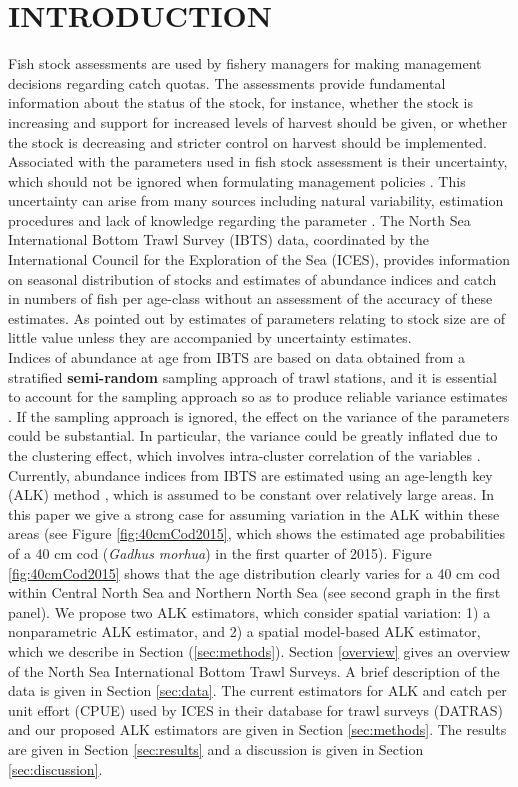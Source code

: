 \documentclass[a4paper 12pt]{article}
\numberwithin{equation}{section}
\begin{document}
\clearpage
\section{\large INTRODUCTION}
Fish stock assessments are used by fishery managers for making management decisions regarding catch quotas. The assessments provide fundamental information about the status of the stock, for instance, whether the stock is increasing and support for increased levels of harvest should be given, or whether the stock is decreasing and stricter control on harvest should be implemented. Associated with the parameters used in fish stock assessment is their uncertainty, which should not be ignored when formulating management policies \citep{walters1981effects, ludwig1981measurement}. This uncertainty can arise from many sources including natural variability, estimation procedures and lack of knowledge regarding the parameter \citep{ehrhardt1997role}. The North Sea International Bottom Trawl Survey (IBTS) data, coordinated by the International Council for the Exploration of the Sea (ICES), provides information on seasonal distribution of stocks and estimates of abundance indices and catch in numbers of fish per age-class without an assessment of the accuracy of these estimates.  As pointed out by  \citet{ludwig1981measurement} estimates of parameters relating to stock size are of little value unless they are accompanied by uncertainty estimates. \\
\indent Indices of abundance at age from IBTS  are based on data obtained from a stratified {\bf semi-random} sampling approach of trawl stations,  and  it is essential to account for the sampling approach so as to produce reliable variance estimates \citep{lehtonen2004practical}. If the sampling approach is ignored, the effect on the variance  of the parameters could be substantial.  In particular, the variance could be greatly inflated  due to the clustering effect, which involves intra-cluster correlation of the variables \citep{aanes2015efficient, lehtonen2004practical}. Currently, abundance indices from  IBTS are estimated using an age-length key (ALK) method \citep{fridriksson1934calculation}, which is assumed to be constant  over relatively large areas. In this paper we give a strong case for assuming variation in the ALK within these areas (see Figure \ref{fig:40cmCod2015}, which shows the estimated age probabilities of a 40 cm cod (\emph{Gadhus morhua}) in the first quarter of 2015). Figure \ref{fig:40cmCod2015} shows that the age distribution clearly varies for a 40 cm cod within Central North Sea and Northern North Sea (see second graph in the first panel). We propose two ALK estimators, which consider spatial variation: 1) a nonparametric  ALK estimator, and 2) a spatial model-based ALK estimator, which we describe in Section (\ref{sec:methods}). Section \ref{overview} gives an  overview of the  North Sea International Bottom Trawl Surveys. A brief description of the data is given in Section \ref{sec:data}. The current estimators for ALK and catch per unit effort (CPUE) used by ICES in their database for trawl surveys (DATRAS) and our proposed ALK estimators are given in Section \ref{sec:methods}. The results are given in Section \ref{sec:results} and a discussion is given in Section \ref{sec:discussion}.
\end{document}
